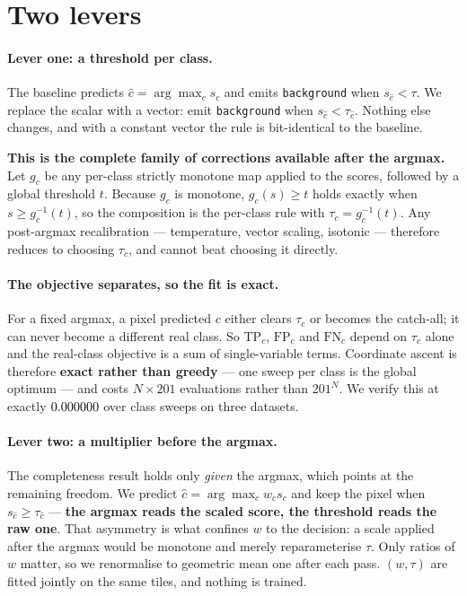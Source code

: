 \documentclass[10pt,twocolumn,letterpaper]{article}          %
\newcommand{\best}[1]{\textbf{#1}}
\newcommand{\bg}{\texttt{background}}
\begin{document}
\section{Two levers}
\label{sec:method}

\paragraph{Lever one: a threshold per class.} The baseline predicts
$\hat{c} = \arg\max_c s_c$ and emits \bg{} when $s_{\hat c} < \tau$. We replace the
scalar with a vector: emit \bg{} when $s_{\hat c} < \tau_{\hat c}$. Nothing else
changes, and with a constant vector the rule is bit-identical to the baseline.

\best{This is the complete family of corrections available after the argmax.} Let
$g_c$ be any per-class strictly monotone map applied to the scores, followed by a
global threshold $t$. Because $g_c$ is monotone, $g_c(s) \geq t$ holds exactly when
$s \geq g_c^{-1}(t)$, so the composition is the per-class rule with
$\tau_c = g_c^{-1}(t)$. Any post-argmax recalibration --- temperature, vector scaling,
isotonic --- therefore reduces to choosing $\tau_c$, and cannot beat choosing it
directly.

\paragraph{The objective separates, so the fit is exact.} For a fixed argmax, a pixel
predicted $c$ either clears $\tau_c$ or becomes the catch-all; it can never become a
different real class. So $\mathrm{TP}_c$, $\mathrm{FP}_c$ and $\mathrm{FN}_c$ depend
on $\tau_c$ alone and the real-class objective is a sum of single-variable terms.
Coordinate ascent is therefore \best{exact rather than greedy} --- one sweep per class
is the global optimum --- and costs $N \times 201$ evaluations rather than $201^N$. We
verify this at exactly $0.000000{}$ over \sepSweeps{} class sweeps on three datasets.

\paragraph{Lever two: a multiplier before the argmax.} The completeness result holds
only \emph{given} the argmax, which points at the remaining freedom. We predict
$\hat{c} = \arg\max_c w_c s_c$ and keep the pixel when $s_{\hat c} \geq \tau_{\hat c}$
--- \best{the argmax reads the scaled score, the threshold reads the raw one}. That
asymmetry is what confines $w$ to the decision: a scale applied after the argmax would
be monotone and merely reparameterise $\tau$. Only ratios of $w$ matter, so we
renormalise to geometric mean one after each pass. $(w, \tau)$ are fitted jointly on
the same tiles, and nothing is trained.
\end{document}
